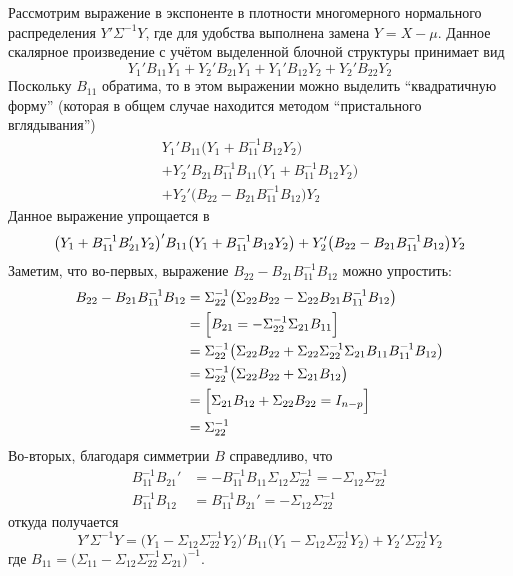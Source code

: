 \documentclass[a4paper]{article}
\begin{document}
Рассмотрим выражение в экспоненте в плотности многомерного нормального распределения
$Y'\Sigma^{-1}Y$, где для удобства выполнена замена $Y = X-\mu$. Данное скалярное
произведение с учётом выделенной блочной структуры принимает вид
\[ Y_1'B_{11}Y_1 + Y_2'B_{21}Y_1 + Y_1'B_{12}Y_2 + Y_2'B_{22}Y_2 \]
Поскольку $B_{11}$ обратима, то в этом выражении можно выделить ``квадратичную
форму'' (которая в общем случае находится методом ``пристального вглядывания'')
\begin{multline*}
  Y_1'B_{11}\bigl( Y_1 + B_{11}^{-1}B_{12}Y_2 \bigr)\\
	+ Y_2'B_{21}B_{11}^{-1} B_{11} \bigl( Y_1 + B_{11}^{-1} B_{12} Y_2\bigr)\\
	+ Y_2'\bigl( B_{22} - B_{21}B_{11}^{-1} B_{12} \bigr)Y_2
\end{multline*}
Данное выражение упрощается в 
\[
  \bigl( Y_1 + B_{11}^{-1}B_{21}'Y_2 \bigr)' B_{11} \bigl( Y_1 + B_{11}^{-1}B_{12}Y_2 \bigr)\\
	+ Y_2'\bigl( B_{22} - B_{21}B_{11}^{-1} B_{12} \bigr)Y_2
\]
Заметим, что во-первых, выражение $B_{22} - B_{21}B_{11}^{-1} B_{12}$ можно упростить:
\begin{align*}
	B_{22} - B_{21}B_{11}^{-1} B_{12}
	&= \Sigma_{22}^{-1}\bigl( \Sigma_{22} B_{22} - \Sigma_{22} B_{21}B_{11}^{-1} B_{12} \bigr)\\
	&= \Bigl[ B_{21} = - \Sigma_{22}^{-1} \Sigma_{21}B_{11} \Bigr]\\
	&= \Sigma_{22}^{-1}\bigl( \Sigma_{22} B_{22} + \Sigma_{22} \Sigma_{22}^{-1} \Sigma_{21} B_{11} B_{11}^{-1} B_{12} \bigr)\\
	&= \Sigma_{22}^{-1}\bigl( \Sigma_{22} B_{22} + \Sigma_{21} B_{12} \bigr)\\
	&= \Bigl[ \Sigma_{21}B_{12} + \Sigma_{22}B_{22} = I_{n-p} \Bigr]\\
	&= \Sigma_{22}^{-1}
\end{align*}
Во-вторых, благодаря симметрии $B$ справедливо, что
\begin{align*}
	B_{11}^{-1}B_{21}' &= - B_{11}^{-1} B_{11} \Sigma_{12}\Sigma_{22}^{-1} = - \Sigma_{12}\Sigma_{22}^{-1}\\
	B_{11}^{-1}B_{12}  &= B_{11}^{-1}B_{21}' = - \Sigma_{12}\Sigma_{22}^{-1}
\end{align*}
откуда получается
\[
Y'\Sigma^{-1}Y
= \bigl( Y_1 - \Sigma_{12}\Sigma_{22}^{-1}Y_2 \bigr)' B_{11} \bigl( Y_1 - \Sigma_{12}\Sigma_{22}^{-1} Y_2 \bigr)
	+ Y_2'\Sigma_{22}^{-1}Y_2
\]
где $B_{11} = \bigl(\Sigma_{11} - \Sigma_{12} \Sigma_{22}^{-1} \Sigma_{21}\bigr)^{-1}$.
\end{document}
